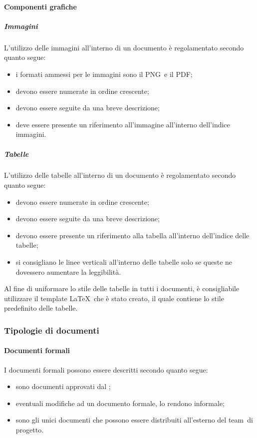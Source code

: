 \documentclass[../NormeProgetto.text]{subfiles}
\begin{document}
		\paragraph{Componenti grafiche}
			\subparagraph{Immagini}
				L'utilizzo delle immagini all'interno di un documento è regolamentato secondo quanto segue:
				\begin{itemize}
					\item i formati ammessi per le immagini sono il PNG\g\ e il PDF\g;
					\item devono essere numerate in ordine crescente;
					\item devono essere seguite da una breve descrizione;
					\item deve essere presente un riferimento all'immagine all'interno dell'indice immagini.
				\end{itemize}
			\subparagraph{Tabelle}
				L'utilizzo delle tabelle all'interno di un documento è regolamentato secondo quanto segue:
				\begin{itemize}
					\item devono essere numerate in ordine crescente;
					\item devono essere seguite da una breve descrizione;
					\item devono essere presente un riferimento alla tabella all'interno dell'indice delle tabelle;
					\item si consigliano le linee verticali all'interno delle tabelle solo se queste ne dovessero aumentare la leggibilità.
				\end{itemize}
				Al fine di uniformare lo stile delle tabelle in tutti i documenti, è consigliabile utilizzare il template \LaTeX\ che è stato creato, il quale contiene lo stile predefinito delle tabelle.
			
	\subsubsection{Tipologie di documenti}
		\paragraph{Documenti formali}
			I documenti formali possono essere descritti secondo quanto segue:
			\begin{itemize}
				\item sono documenti approvati dal \responsabilediprogetto;
				\item eventuali modifiche ad un documento formale, lo rendono informale;
				\item sono gli unici documenti che possono essere distribuiti all'esterno del team\g\ di progetto.
			\end{itemize}
		
\end{document}
